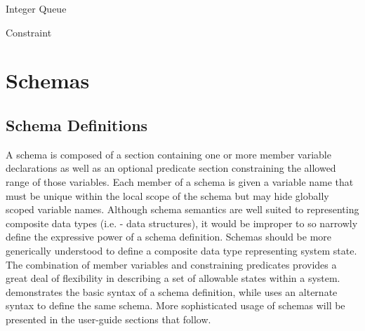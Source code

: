 \documentclass[letterpaper,10pt,draft]{book}
\begin{document}
\begin{example}
\begin{minipage}[t]{0.49\linewidth}
   
\end{minipage}
\begin{minipage}[t]{0.49\linewidth}
   \azed
   
\end{minipage}

   \caption{Integer Queue}
   \label{ex:IntQueue}
\end{example}

\begin{example}
\begin{minipage}[t]{0.49\linewidth}
   
\end{minipage}
\begin{minipage}[t]{0.49\linewidth}
   \azed
   
\end{minipage}

   \caption{Constraint}
   \label{ex:Const}
\end{example}

\section{Schemas}
   \label{sect:Schema}

\subsection{Schema Definitions}
   \label{sect:SchDef}

A schema is composed of a section containing one or more member variable declarations
as well as an optional predicate section constraining the allowed range of those
variables.  Each member of a schema is given a variable name that must be unique
within the local scope of the schema but may hide globally scoped variable names.
Although schema semantics are well suited to representing composite data types
(i.e. - data structures), it would be improper to so narrowly define the expressive
power of a schema definition.  Schemas should be more generically understood to
define a composite data type representing system state.  The combination of member
variables and constraining predicates provides a great deal of flexibility in describing
a set of allowable states within a system.   demonstrates the basic
syntax of a schema definition, while  uses an alternate syntax
to define the same schema.  More sophisticated usage of schemas will be presented
in the user-guide sections that follow.
\end{document}
